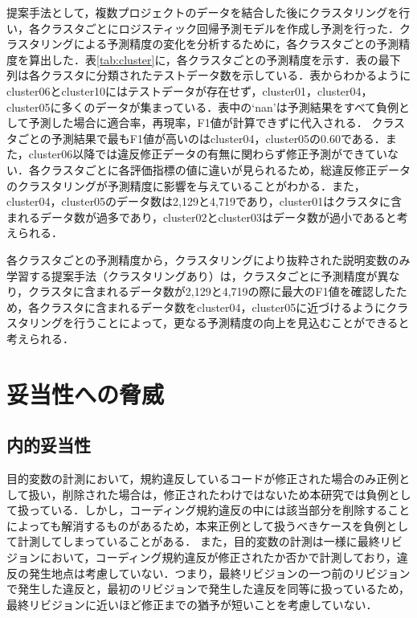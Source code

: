 \documentclass[submit,noauthor,ses,dvipdfmx]{ipsj}
\begin{document}
提案手法として，複数プロジェクトのデータを結合した後にクラスタリングを行い，各クラスタごとにロジスティック回帰予測モデルを作成し予測を行った．クラスタリングによる予測精度の変化を分析するために，各クラスタごとの予測精度を算出した．表\ref{tab:cluster}に，各クラスタごとの予測精度を示す．表の最下列は各クラスタに分類されたテストデータ数を示している．表からわかるようにcluster06とcluster10にはテストデータが存在せず，cluster01，cluster04，cluster05に多くのデータが集まっている．表中の`nan'は予測結果をすべて負例として予測した場合に適合率，再現率，F1値が計算できずに代入される．
クラスタごとの予測結果で最もF1値が高いのはcluster04，cluster05の0.60である．また，cluster06以降では違反修正データの有無に関わらず修正予測ができていない．各クラスタごとに各評価指標の値に違いが見られるため，総違反修正データのクラスタリングが予測精度に影響を与えていることがわかる．また，cluster04，cluster05のデータ数は2,129と4,719であり，cluster01はクラスタに含まれるデータ数が過多であり，cluster02とcluster03はデータ数が過小であると考えられる．

各クラスタごとの予測精度から，クラスタリングにより抜粋された説明変数のみ学習する提案手法（クラスタリングあり）は，クラスタごとに予測精度が異なり，クラスタに含まれるデータ数が2,129と4,719の際に最大のF1値を確認したため，各クラスタに含まれるデータ数をcluster04，cluster05に近づけるようにクラスタリングを行うことによって，更なる予測精度の向上を見込むことができると考えられる．

\section{妥当性への脅威}\label{chap:heuristic}
\subsection{内的妥当性}


目的変数の計測において，規約違反しているコードが修正された場合のみ正例として扱い，削除された場合は，修正されたわけではないため本研究では負例として扱っている．しかし，コーディング規約違反の中には該当部分を削除することによっても解消するものがあるため，本来正例として扱うべきケースを負例として計測してしまっていることがある．
また，目的変数の計測は一様に最終リビジョンにおいて，コーディング規約違反が修正されたか否かで計測しており，違反の発生地点は考慮していない．つまり，最終リビジョンの一つ前のリビジョンで発生した違反と，最初のリビジョンで発生した違反を同等に扱っているため，最終リビジョンに近いほど修正までの猶予が短いことを考慮していない．
\end{document}
